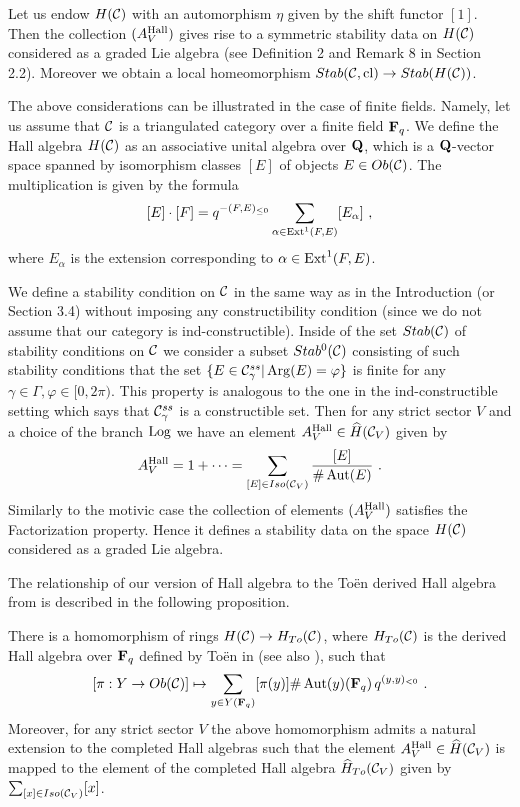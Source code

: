 \documentclass[12pt]{article}
\begin{document}
\begin{cor} Let us endow $H({\mathcal C})$ with an automorphism $\eta$ given by the shift functor $[1]$. Then the collection $(A_V^{\operatorname{Hall}})$ gives rise to a symmetric
stability data on $H({\mathcal C})$ considered as a graded Lie algebra (see  Definition 2 and Remark 8 in Section 2.2). Moreover we obtain a local homeomorphism $Stab({\mathcal C},\operatorname{cl})\to Stab(H({\mathcal C}))$.



\end{cor}





The above considerations can be illustrated in the case of finite fields. Namely, let us assume that ${\mathcal C}$ is a triangulated category over a finite field ${\bf F}_q$. We define the Hall algebra $H({\mathcal C})$ as an associative unital algebra over ${\bf Q}$, which is a ${\bf Q}$-vector space spanned by isomorphism classes $[E]$ of objects $E\in Ob({\mathcal C})$.
The multiplication is given by the formula
$$[E]\cdot[F]=q^{-(F,E)_{\le 0}}\sum_{\alpha\in \operatorname{Ext}^1(F,E)}[E_{\alpha}]\,\,,$$
where $E_{\alpha}$ is the extension corresponding to $\alpha\in \operatorname{Ext}^1(F,E)$.



We define a stability condition on ${\mathcal C}$ in the same way as in the Introduction (or Section 3.4) without imposing any constructibility condition (since we do not assume that our category is ind-constructible). Inside of the set $Stab({\mathcal C})$ of stability conditions on ${\mathcal C}$ we consider a subset $Stab^0({\mathcal C})$ consisting of such stability conditions that the set $\{E\in {\mathcal C}_{\gamma}^{ss}|\operatorname{Arg}(E)=\varphi\}$ is finite for any $\gamma\in \Gamma, \varphi\in [0,2\pi)$. This property is analogous to  the one in the ind-constructible setting which says
 that ${\mathcal C}_{\gamma}^{ss}$ is a constructible set.
Then for any strict sector $V$ and a choice of the branch $\operatorname{Log}$ we have an element
$A_V^{\operatorname{Hall}}\in \widehat{H}({\mathcal C}_V)$ given by
$$A_V^{\operatorname{Hall}}=1+\dots=\sum_{[E]\in Iso({\mathcal C}_V)}{[E]\over {\#\operatorname{Aut}(E)}}\,\,.$$
Similarly to the motivic case the collection of elements $(A_V^{\operatorname{Hall}})$ satisfies the Factorization property. Hence it defines a stability data on the space $H({\mathcal C})$ considered as a graded Lie algebra.


The relationship of our version of Hall algebra to the To\"en derived Hall algebra from \cite{To} is described in the following proposition.

\begin{prp} There is a homomorphism of rings $H({\mathcal C})\to H_{To}({\mathcal C})$,
where $H_{To}({\mathcal C})$ is the derived Hall algebra over ${\bf F}_q$ defined by To\"en in \cite{To} (see also \cite{XiXu}),
such that
$$[\pi: Y\to Ob({\mathcal C})]\mapsto \sum_{y\in Y({\bf F}_q)}[\pi(y)]\#\operatorname{Aut}(y)({\bf F}_q)\,q^{(y,y)_{<0}}\,\,.$$
Moreover, for any strict sector $V$ the above homomorphism admits a natural
extension to the completed Hall algebras such that the element $A_V^{\operatorname{Hall}}\in \widehat{H}({\mathcal C}_V)$ is mapped
to the element of the completed Hall algebra $\widehat{H}_{To}({\mathcal C}_V)$ given by $\sum_{[x]\in Iso({\mathcal C}_V)}[x]$.

\end{prp}
\end{document}
